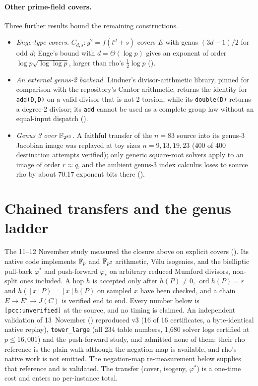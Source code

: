 \paragraph{Other prime-field covers.} Three further results bound the
remaining constructions.
\begin{itemize}
\item \emph{Enge-type covers.} $C_{d,s}:y^2=f(t^d+s)$ covers $E$ with genus
  $(3d-1)/2$ for odd $d$; Enge's bound with $d=\Theta(\log p)$ gives an
  exponent of order $\log p\sqrt{\log\log p}$, larger than rho's
  $\frac12\log p$ ().
\item \emph{An external genus-2 backend.} Lindner's divisor-arithmetic
  library, pinned for comparison with the repository's Cantor arithmetic,
  returns the identity for \texttt{add(D,D)} on a valid divisor that is not
  2-torsion, while its \texttt{double(D)} returns a degree-2 divisor; its
  \texttt{add} cannot be used as a complete group law without an
  equal-input dispatch ().
\item \emph{Genus 3 over $\mathbb{F}_{2^{83}}$.} A faithful transfer of the
  $n=83$ source into its genus-3 Jacobian image was replayed at toy sizes
  $n=9,13,19,23$ (400 of 400 destination attempts verified); only generic
  square-root solvers apply to an image of order $r\approx q$, and the
  ambient genus-3 index calculus loses to source rho by about 70.17
  exponent bits there ().
\end{itemize}

\section{Chained transfers and the genus ladder}\label{sec:jac-chain}

The 11--12 November study measured the closure above on explicit covers
(). Its native code
implements $\mathbb{F}_p$ and $\mathbb{F}_{p^2}$ arithmetic, V\'elu isogenies, and the
bielliptic pull-back $\varphi^*$ and push-forward $\varphi_*$ on arbitrary
reduced Mumford divisors, non-split ones included. A hop $h$ is accepted
only after $h(P)\ne0$, $\operatorname{ord}h(P)=r$ and $h([x]P)=[x]h(P)$ on
sampled $x$ have been checked, and a chain $E\to E'\to J(C)$ is verified end
to end. Every number below is \texttt{[pcc:unverified]} at the source, and no
timing is claimed. An independent validation of 13~November
() reproduced v3 (16 of 16
certificates, a byte-identical native replay), \texttt{tower\_large} (all 234
table numbers, 1{,}680 solver logs certified at $p\le16{,}001$) and the
push-forward study, and admitted none of them: their rho reference is the
plain walk although the negation map is available, and rho's native work
is not emitted. The negation-map re-measurement below supplies that
reference and is validated. The transfer (cover, isogeny, $\varphi^*$) is a
one-time cost and enters no per-instance total.

